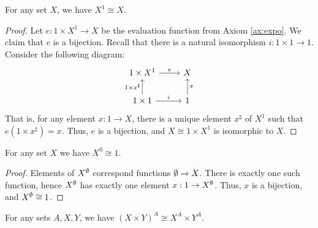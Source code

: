 





\begin{prop} For any set $X$, we have $X^1\cong X$. \end{prop}

\begin{proof} Let $e:1\times X^1\to X$ be the evaluation function from
  Axiom \ref{ax:expo}.  We claim that $e$ is a bijection.  Recall that
  there is a natural isomorphism $i:1\times 1\to 1$.  Consider the
  following diagram:
  \[ \begin{tikzcd}
    1\times X^1 \arrow{r}{e} & X \\
    1\times 1 \arrow{u}[left]{1\times x^\sharp} \arrow{r}{i} & 1
    \arrow{u}[right]{x} \end{tikzcd} \] That is, for any element
  $x:1\to X$, there is a unique element $x^\sharp$ of $X^1$ such that
  $e(1\times x^\sharp)=x$.  Thus, $e$ is a bijection, and $X\cong
  1\times X^1$ is isomorphic to $X$.
\end{proof}


\begin{prop} For any set $X$ we have $X^0\cong 1$. \end{prop}

\begin{proof} Elements of $X^\emptyset$ correspond functions $\emptyset\to X$.
  There is exactly one such function, hence $X^{\emptyset}$ has exactly one
  element $x:1\to X^{\emptyset}$.  Thus, $x$ is a bijection, and
  $X^{\emptyset}\cong 1$.
\end{proof}

\begin{prop} For any sets $A,X,Y$, we have $(X\times Y)^A\cong
  X^A\times Y^A$. \end{prop}

